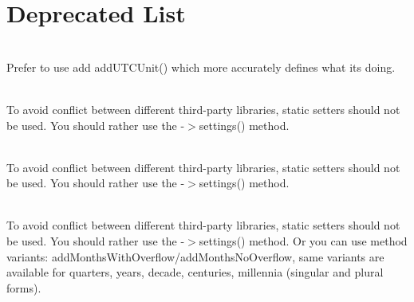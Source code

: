 \chapter{Deprecated List}
\hypertarget{deprecated}{}\label{deprecated}

\begin{DoxyRefList}
\item[Member \doxylink{interface_carbon_1_1_carbon_interface_a69bfb87a2ab4d3166b5da61b5cba852a}{Carbon\textbackslash{}Carbon\+Interface\+::add\+Real\+Unit} (string \$unit, \$value=1)]\hfill \\
\label{deprecated__deprecated000130}%
%
Prefer to use add add\+UTCUnit() which more accurately defines what it\textquotesingle{}s doing. 
\item[Member \doxylink{interface_carbon_1_1_carbon_interface_a6275e0680431a1b0fef3eba9052c2d56}{Carbon\textbackslash{}Carbon\+Interface\+::disable\+Human\+Diff\+Option} (int \$human\+Diff\+Option)]\hfill \\
\label{deprecated__deprecated000131}%
%
To avoid conflict between different third-\/party libraries, static setters should not be used. You should rather use the -\/\texorpdfstring{$>$}{>}settings() method.  
\item[Member \doxylink{interface_carbon_1_1_carbon_interface_a07835be4e412eecd84be7a36d6f31de9}{Carbon\textbackslash{}Carbon\+Interface\+::enable\+Human\+Diff\+Option} (int \$human\+Diff\+Option)]\hfill \\
\label{deprecated__deprecated000132}%
%
To avoid conflict between different third-\/party libraries, static setters should not be used. You should rather use the -\/\texorpdfstring{$>$}{>}settings() method.  
\item[Member \doxylink{interface_carbon_1_1_carbon_interface_ab72dd0d9c0fb07d57c93e0b28e0cafd8}{Carbon\textbackslash{}Carbon\+Interface\+::reset\+Months\+Overflow} ()]\hfill \\
\label{deprecated__deprecated000133}%
%
To avoid conflict between different third-\/party libraries, static setters should not be used. You should rather use the -\/\texorpdfstring{$>$}{>}settings() method. Or you can use method variants\+: add\+Months\+With\+Overflow/add\+Months\+No\+Overflow, same variants are available for quarters, years, decade, centuries, millennia (singular and plural forms).  

\end{DoxyRefList}

